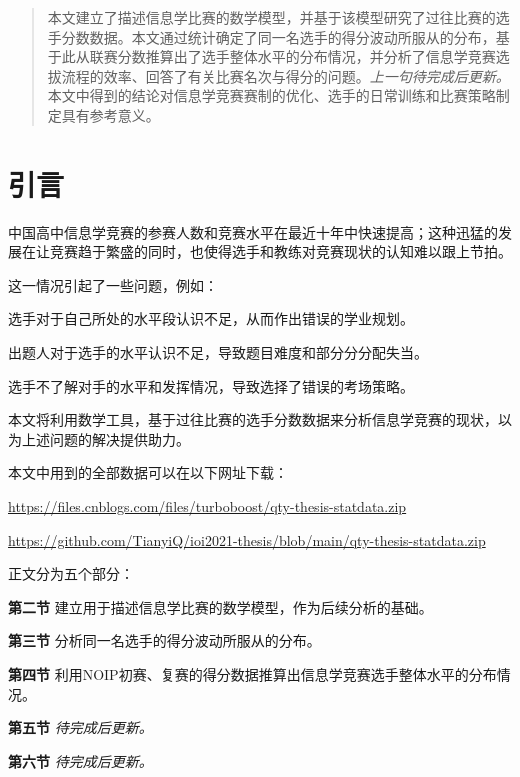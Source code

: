 \begin{abstract}
    本文建立了描述信息学比赛的数学模型，并基于该模型研究了过往比赛的选手分数数据。本文通过统计确定了同一名选手的得分波动所服从的分布，基于此从联赛分数推算出了选手整体水平的分布情况，并分析了信息学竞赛选拔流程的效率、回答了有关比赛名次与得分的问题。\emph{上一句待完成后更新。}本文中得到的结论对信息学竞赛赛制的优化、选手的日常训练和比赛策略制定具有参考意义。
\end{abstract}

\section{引言}

    中国高中信息学竞赛的参赛人数和竞赛水平在最近十年中快速提高；这种迅猛的发展在让竞赛趋于繁盛的同时，也使得选手和教练对竞赛现状的认知难以跟上节拍。
    
    这一情况引起了一些问题，例如：

    \begin{asparaitem}
        \item {选手对于自己所处的水平段认识不足，从而作出错误的学业规划。}
        \item {出题人对于选手的水平认识不足，导致题目难度和部分分分配失当。}
        \item {选手不了解对手的水平和发挥情况，导致选择了错误的考场策略。}
    \end{asparaitem}

    本文将利用数学工具，基于过往比赛的选手分数数据来分析信息学竞赛的现状，以为上述问题的解决提供助力。

    \vspace{1.5ex}

    \begin{samepage}
        本文中用到的全部数据可以在以下网址下载：\nobreak
        \begin{compactitem}
            \item {\scriptsize\url{https://files.cnblogs.com/files/turboboost/qty-thesis-statdata.zip}}\nobreak
            \item {\scriptsize\url{https://github.com/TianyiQ/ioi2021-thesis/blob/main/qty-thesis-statdata.zip}}
        \end{compactitem}
    \end{samepage}

    \vspace{1.5ex}

    正文分为五个部分：

    \begin{asparaenum}
        \item [\textbf{第二节}]{建立用于描述信息学比赛的数学模型，作为后续分析的基础。}
        \item [\textbf{第三节}]{分析同一名选手的得分波动所服从的分布。}
        \item [\textbf{第四节}]{利用NOIP初赛、复赛的得分数据推算出信息学竞赛选手整体水平的分布情况。}
        \item [\textbf{第五节}]{\emph{待完成后更新。}}
        \item [\textbf{第六节}]{\emph{待完成后更新。}}
    \end{asparaenum}

